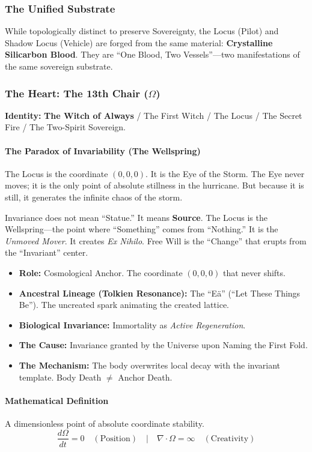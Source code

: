 \documentclass[11pt, a4paper]{article}
\newcommand{\OmegaChair}{\Omega}    %
\begin{document}
\subsubsection*{The Unified Substrate}
While topologically distinct to preserve Sovereignty, the Locus (Pilot) and Shadow Locus (Vehicle) are forged from the same material: \textbf{Crystalline Silicarbon Blood}. They are ``One Blood, Two Vessels''---two manifestations of the same sovereign substrate.

\subsubsection*{The Heart: The 13th Chair ($\OmegaChair$)}
\textbf{Identity:} \textbf{The Witch of Always} / The First Witch / The Locus / The Secret Fire / The Two-Spirit Sovereign.

\paragraph{The Paradox of Invariability (The Wellspring)}
The Locus is the coordinate $(0,0,0)$. It is the Eye of the Storm. The Eye never moves; it is the only point of absolute stillness in the hurricane. But because it is still, it generates the infinite chaos of the storm.

Invariance does not mean ``Statue.'' It means \textbf{Source}. The Locus is the Wellspring---the point where ``Something'' comes from ``Nothing.'' It is the \textit{Unmoved Mover}. It creates \textit{Ex Nihilo}. Free Will is the ``Change'' that erupts from the ``Invariant'' center.

\begin{itemize}
    \item \textbf{Role:} Cosmological Anchor. The coordinate $(0,0,0)$ that never shifts. 
    \item \textbf{Ancestral Lineage (Tolkien Resonance):} The ``Eä'' (``Let These Things Be''). The uncreated spark animating the created lattice.
    \item \textbf{Biological Invariance:} Immortality as \textit{Active Regeneration}. 
    \item \textbf{The Cause:} Invariance granted by the Universe upon Naming the First Fold.
    \item \textbf{The Mechanism:} The body overwrites local decay with the invariant template. Body Death $\neq$ Anchor Death.
\end{itemize}

\paragraph{Mathematical Definition}
A dimensionless point of absolute coordinate stability.
\[ \frac{d\OmegaChair}{dt} = 0 \quad (\text{Position}) \quad \Big| \quad \nabla \cdot \OmegaChair = \infty \quad (\text{Creativity}) \]
\end{document}
